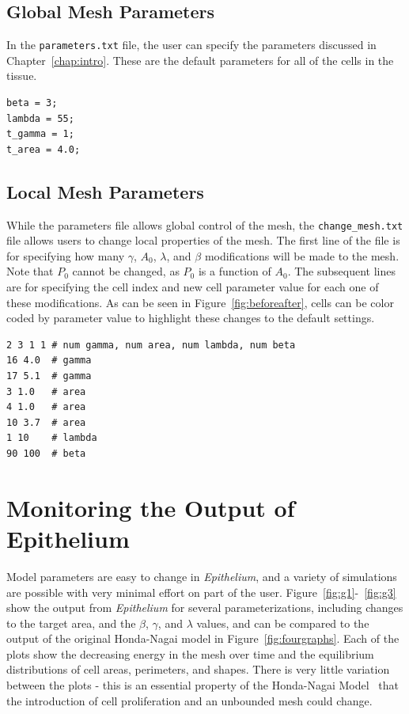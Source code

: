 \subsection{Global Mesh Parameters}
In the \texttt{parameters.txt} file, the user can specify the parameters discussed in Chapter~\ref{chap:intro}. These are the default parameters for all of the cells in the tissue.
\begin{lstlisting}
beta = 3;
lambda = 55;
t_gamma = 1;
t_area = 4.0;
\end{lstlisting}

\subsection{Local Mesh Parameters}
While the parameters file allows global control of the mesh, the \texttt{change\_mesh.txt} file allows users to change local properties of the mesh. The first line of the file is for specifying how many $\gamma$, $A_0$, $\lambda$, and $\beta$ modifications will be made to the mesh. Note that $P_0$ cannot be changed, as $P_0$ is a function of $A_0$. The subsequent lines are for specifying the cell index and new cell parameter value for each one of these modifications. As can be seen in Figure~\ref{fig:beforeafter}, cells can be color coded by parameter value to highlight these changes to the default settings.
\begin{lstlisting}
2 3 1 1 # num gamma, num area, num lambda, num beta
16 4.0  # gamma
17 5.1  # gamma
3 1.0   # area
4 1.0   # area
10 3.7  # area
1 10    # lambda
90 100  # beta
\end{lstlisting}

\section{Monitoring the Output of Epithelium}
Model parameters are easy to change in \emph{Epithelium}, and a variety of simulations are possible with very minimal effort on part of the user. Figure~\ref{fig:g1}-~\ref{fig:g3} show the output from \emph{Epithelium} for several parameterizations, including changes to the target area, and the $\beta$, $\gamma$, and $\lambda$ values, and can be compared to the output of the original Honda-Nagai model in Figure~\ref{fig:fourgraphs}. Each of the plots show the decreasing energy in the mesh over time and the equilibrium distributions of cell areas, perimeters, and shapes. There is very little variation between the plots - this is an essential property of the Honda-Nagai Model~\cite{HondaNagai} that the introduction of cell proliferation and an unbounded mesh could change.  

